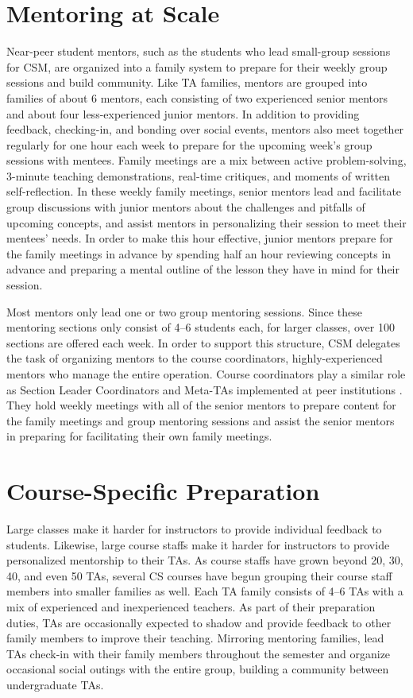 \section{Mentoring at Scale}

Near-peer student mentors, such as the students who lead small-group sessions for CSM, are organized into a family system to prepare for their weekly group sessions and build community. Like TA families, mentors are grouped into families of about 6 mentors, each consisting of two experienced senior mentors and about four less-experienced junior mentors. In addition to providing feedback, checking-in, and bonding over social events, mentors also meet together regularly for one hour each week to prepare for the upcoming week's group sessions with mentees. Family meetings are a mix between active problem-solving, 3-minute teaching demonstrations, real-time critiques, and moments of written self-reflection. In these weekly family meetings, senior mentors lead and facilitate group discussions with junior mentors about the challenges and pitfalls of upcoming concepts, and assist mentors in personalizing their session to meet their mentees' needs. In order to make this hour effective, junior mentors prepare for the family meetings in advance by spending half an hour reviewing concepts in advance and preparing a mental outline of the lesson they have in mind for their session.

Most mentors only lead one or two group mentoring sessions. Since these mentoring sections only consist of 4--6 students each, for larger classes, over 100 sections are offered each week. In order to support this structure, CSM delegates the task of organizing mentors to the course coordinators, highly-experienced mentors who manage the entire operation. Course coordinators play a similar role as Section Leader Coordinators and Meta-TAs implemented at peer institutions \cite{Reges:2003, Roberts:1995, Reges:1988}. They hold weekly meetings with all of the senior mentors to prepare content for the family meetings and group mentoring sessions and assist the senior mentors in preparing for facilitating their own family meetings.

\section{Course-Specific Preparation}

Large classes make it harder for instructors to provide individual feedback to students. Likewise, large course staffs make it harder for instructors to provide personalized mentorship to their TAs. As course staffs have grown beyond 20, 30, 40, and even 50 TAs, several CS courses have begun grouping their course staff members into smaller families as well. Each TA family consists of 4--6 TAs with a mix of experienced and inexperienced teachers. As part of their preparation duties, TAs are occasionally expected to shadow and provide feedback to other family members to improve their teaching. Mirroring mentoring families, lead TAs check-in with their family members throughout the semester and organize occasional social outings with the entire group, building a community between undergraduate TAs.

